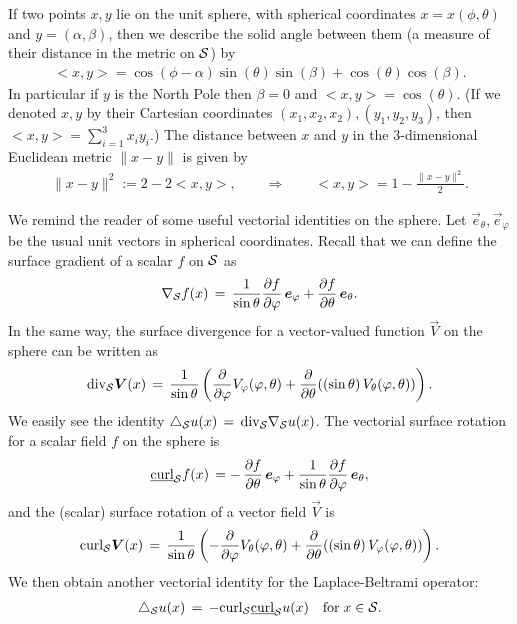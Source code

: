 If two points $x,y$ lie on the unit sphere, with spherical coordinates
$x=x(\phi,\theta)$ and $y=(\alpha,\beta)$, then we describe the solid
angle between them (a measure of their distance in the metric on $\S$)
by
\begin{align*}
  <x,y> =\cos(\phi-\alpha)\sin(\theta)\sin(\beta)+
    \cos(\theta)\cos(\beta).
\end{align*} 
In particular if $y$ is the North Pole then  $\beta=0$ and
$<x,y>=\cos(\theta)$. (If we denoted $x,y$  by their Cartesian
coordinates $(x_1,x_2,x_2),(y_1,y_2,y_3)$, then $<x,y> = \sum_{i=1}^3
x_iy_i$.) The distance between $x$ and $y$ in the 3-dimensional
Euclidean metric $\|x-y\|$ is given by 
\begin{align*}
  \|x-y\|^2 := 2-2<x,y>, \qquad \Rightarrow \qquad 
    <x,y>= 1-\frac{\|x-y\|^2}{2}.
\end{align*}

We remind the reader of some useful vectorial identities on the sphere.
Let $ \vec{e}_\theta, \vec{e}_{\varphi} $ be the usual unit vectors in
spherical coordinates.  Recall that we can define the surface gradient
of a scalar $f$ on $\S$ as
\begin{align*}
  \nabla_{\S} f(x) \,  = \, \frac{1}{\sin \theta}
  \frac{\partial f}{\partial \varphi} \,\vec{e}_{\varphi} + 
  \frac{\partial f}{\partial \theta}\, \vec{e}_{\theta}.
\end{align*}
In the same way, the surface divergence for a vector-valued
function $\vec{V}$ on the sphere can be written as
\begin{align*}
  \mbox{div}_{\S} \vec{V}(x) \, = \, 
  \frac{1}{\sin \theta} \left(
  \frac{\partial}{\partial \varphi}
  V_{\varphi}(\varphi,\theta) +
  \frac{\partial}{\partial \theta} ((\sin\theta) \, 
  V_{\theta}(\varphi,\theta) ) \right).
\end{align*}
We easily see the identity $\lap_{\S}u(x) \, = \,
\mbox{div}_{\S}\nabla_{\S} u(x)$.  The vectorial surface rotation for a
scalar field $f$ on the sphere is 
\begin{align*}
  \underline{\mbox{curl}}_{\S} f(x) \, = -\, 
  \frac{\partial f}{\partial \theta} \,\vec{e}_{\varphi} + 
  \frac{1}{\sin\theta}\frac{\partial f}{\partial \varphi}\, 
  \vec{e}_{\theta},
\end{align*}
and the (scalar) surface rotation of a vector field $\vec{V}$ is
\begin{align*}
  \mbox{curl}_{\S} \vec{V}(x) \, = \,
  \frac{1}{\sin \theta} \left(
  - \frac{\partial}{\partial \varphi} V_{\theta}(\varphi,\theta) +
  \frac{\partial}{\partial \theta} ((\sin \theta) \,   
  V_{\varphi}(\varphi,\theta)) \right).
\end{align*}
We then obtain another vectorial identity for the Laplace-Beltrami
operator:
\begin{align*}
  \lap_{\S} u(x) \, = \, - \mbox{curl}_{\S} 
  \underline{\mbox{curl}}_{\S} u(x) \quad \mbox{for} \; x \in {\S}.
\end{align*}


